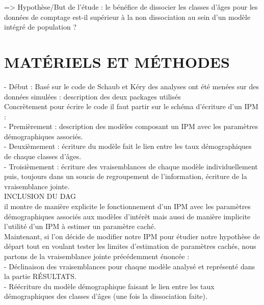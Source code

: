 \documentclass[12pt,a4paper]{article}
\begin{document}
=> Hypothèse/But de l'étude : le bénéfice de dissocier les classes d’âges pour les données de comptage est-il supérieur à la non dissociation au sein d’un modèle intégré de population ?\\


\section{MATÉRIELS ET MÉTHODES}
- Début : Basé sur le code de Schaub et Kéry des analyses ont été menées sur des données simulées : description des deux packages utilisés\\


Concrètement pour écrire le code il faut partir sur le schéma d'écriture d'un IPM :\\

- Premièrement : description des modèles composant un IPM avec les paramètres démographiques associés.\\

- Deuxièmement : écriture du modèle fait le lien entre les taux démographiques de chaque classes d'âges.\\
- Troisièmement : écriture des vraisemblances de chaque modèle individuellement puis, toujours dans un soucis de regroupement de l'information, écriture de la vraisemblance jointe.\\

INCLUSION DU DAG\\
il montre de manière explicite le fonctionnement d'un IPM avec les paramètres démographiques associés aux modèles d'intérêt mais aussi de manière implicite l'utilité d'un IPM à estimer un paramètre caché.\\

Maintenant, si l'on décide de modifier notre IPM pour étudier notre hypothèse de départ tout en voulant tester les limites d'estimation de paramètres cachés, nous partons de la vraisemblance jointe précédemment énoncée : \\

- Déclinaison des vraisemblances pour chaque modèle analysé et représenté dans la partie RÉSULTATS.\\

- Réécriture du modèle démographique faisant le lien entre les taux démographiques des classes d'âges (une fois la dissociation faite).\\
\end{document}
